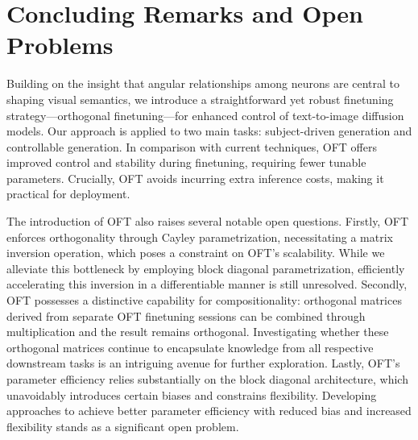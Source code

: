 \section{Concluding Remarks and Open Problems}

Building on the insight that angular relationships among neurons are central to shaping visual semantics, we introduce a straightforward yet robust finetuning strategy—orthogonal finetuning—for enhanced control of text-to-image diffusion models. Our approach is applied to two main tasks: subject-driven generation and controllable generation. In comparison with current techniques, OFT offers improved control and stability during finetuning, requiring fewer tunable parameters. Crucially, OFT avoids incurring extra inference costs, making it practical for deployment.

The introduction of OFT also raises several notable open questions. Firstly, OFT enforces orthogonality through Cayley parametrization, necessitating a matrix inversion operation, which poses a constraint on OFT's scalability. While we alleviate this bottleneck by employing block diagonal parametrization, efficiently accelerating this inversion in a differentiable manner is still unresolved. Secondly, OFT possesses a distinctive capability for compositionality: orthogonal matrices derived from separate OFT finetuning sessions can be combined through multiplication and the result remains orthogonal. Investigating whether these orthogonal matrices continue to encapsulate knowledge from all respective downstream tasks is an intriguing avenue for further exploration. Lastly, OFT's parameter efficiency relies substantially on the block diagonal architecture, which unavoidably introduces certain biases and constrains flexibility. Developing approaches to achieve better parameter efficiency with reduced bias and increased flexibility stands as a significant open problem.